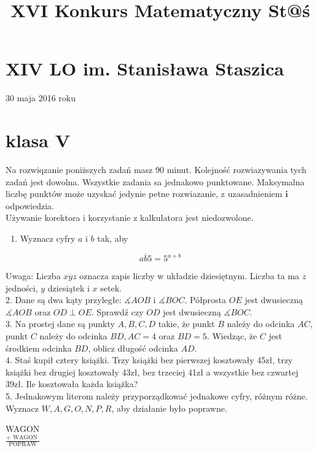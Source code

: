 \documentclass[10pt]{article}
\title{XVI Konkurs Matematyczny St@ś }
\author{}
\date{}
\begin{document}
\maketitle
\section*{XIV LO im. Stanisława Staszica}
30 maja 2016 roku

\section*{klasa V}
Na rozwiqzanie poniższych zadań masz 90 minut. Kolejność rozwiazywania tych zadań jest dowolna. Wszystkie zadania sa jednakowo punktowane. Maksymalna liczbę punktów może uzyskać jedynie petne rozwiazanie, z uzasadnieniem \(\boldsymbol{i}\) odpowiedzia.\\
Używanie korektora i korzystanie z kalkulatora jest niedozwolone.

\begin{enumerate}
  \item Wyznacz cyfry \(a\) i \(b\) tak, aby
\end{enumerate}

\[
\overline{a b 5}=5^{a+b}
\]

Uwaga: Liczba \(\overline{x y z}\) oznacza zapis liczby w układzie dziesiętnym. Liczba ta ma \(z\) jedności, \(y\) dziesiątek i \(x\) setek.\\
2. Dane są dwa kąty przyległe: \(\measuredangle A O B\) i \(\measuredangle B O C\). Półprosta \(O E\) jest dwusieczną \(\measuredangle A O B\) oraz \(O D \perp O E\). Sprawdź czy \(O D\) jest dwusieczną \(\measuredangle B O C\).\\
3. Na prostej dane są punkty \(A, B, C, D\) takie, że punkt \(B\) należy do odcinka \(A C\), punkt \(C\) należy do odcinka \(B D, A C=4\) oraz \(B D=5\). Wiedząc, że \(C\) jest środkiem odcinka \(B D\), oblicz długość odcinka \(A D\).\\
4. Staś kupił cztery książki. Trzy książki bez pierwszej kosztowały 45zł, trzy książki bez drugiej kosztowały 43zł, bez trzeciej 41zł a wszystkie bez czwartej 39zł. Ile kosztowała każda książka?\\
5. Jednakowym literom należy przyporządkować jednakowe cyfry, różnym różne. Wyznacz \(W, A, G, O, N, P, R\), aby działanie było poprawne.

WAGON\\
\(\frac{+ \text { WAGON }}{\text { POPRAW }}\)
\end{document}

